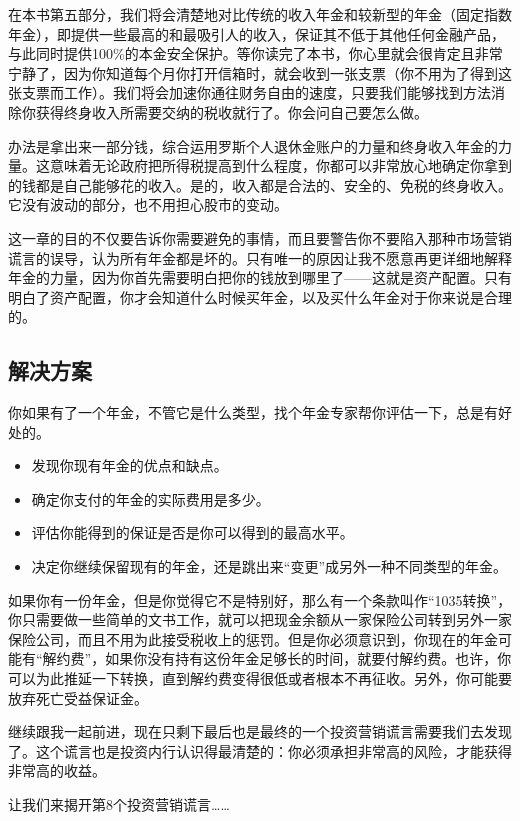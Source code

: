 在本书第五部分，我们将会清楚地对比传统的收入年金和较新型的年金（固定指数年金），即提供一些最高的和最吸引人的收入，保证其不低于其他任何金融产品，与此同时提供100\%的本金安全保护。等你读完了本书，你心里就会很肯定且非常宁静了，因为你知道每个月你打开信箱时，就会收到一张支票（你不用为了得到这张支票而工作）。我们将会加速你通往财务自由的速度，只要我们能够找到方法消除你获得终身收入所需要交纳的税收就行了。你会问自己要怎么做。

办法是拿出来一部分钱，综合运用罗斯个人退休金账户的力量和终身收入年金的力量。这意味着无论政府把所得税提高到什么程度，你都可以非常放心地确定你拿到的钱都是自己能够花的收入。是的，收入都是合法的、安全的、免税的终身收入。它没有波动的部分，也不用担心股市的变动。

这一章的目的不仅要告诉你需要避免的事情，而且要警告你不要陷入那种市场营销谎言的误导，认为所有年金都是坏的。只有唯一的原因让我不愿意再更详细地解释年金的力量，因为你首先需要明白把你的钱放到哪里了——这就是资产配置。只有明白了资产配置，你才会知道什么时候买年金，以及买什么年金对于你来说是合理的。

\subsection{解决方案}

你如果有了一个年金，不管它是什么类型，找个年金专家帮你评估一下，总是有好处的。

\begin{itemize}
\item 发现你现有年金的优点和缺点。
\item 确定你支付的年金的实际费用是多少。
\item 评估你能得到的保证是否是你可以得到的最高水平。
\item 决定你继续保留现有的年金，还是跳出来“变更”成另外一种不同类型的年金。
\end{itemize}

如果你有一份年金，但是你觉得它不是特别好，那么有一个条款叫作“1035转换”，你只需要做一些简单的文书工作，就可以把现金余额从一家保险公司转到另外一家保险公司，而且不用为此接受税收上的惩罚。但是你必须意识到，你现在的年金可能有“解约费”，如果你没有持有这份年金足够长的时间，就要付解约费。也许，你可以为此推延一下转换，直到解约费变得很低或者根本不再征收。另外，你可能要放弃死亡受益保证金。

继续跟我一起前进，现在只剩下最后也是最终的一个投资营销谎言需要我们去发现了。这个谎言也是投资内行认识得最清楚的：你必须承担非常高的风险，才能获得非常高的收益。

让我们来揭开第8个投资营销谎言……
